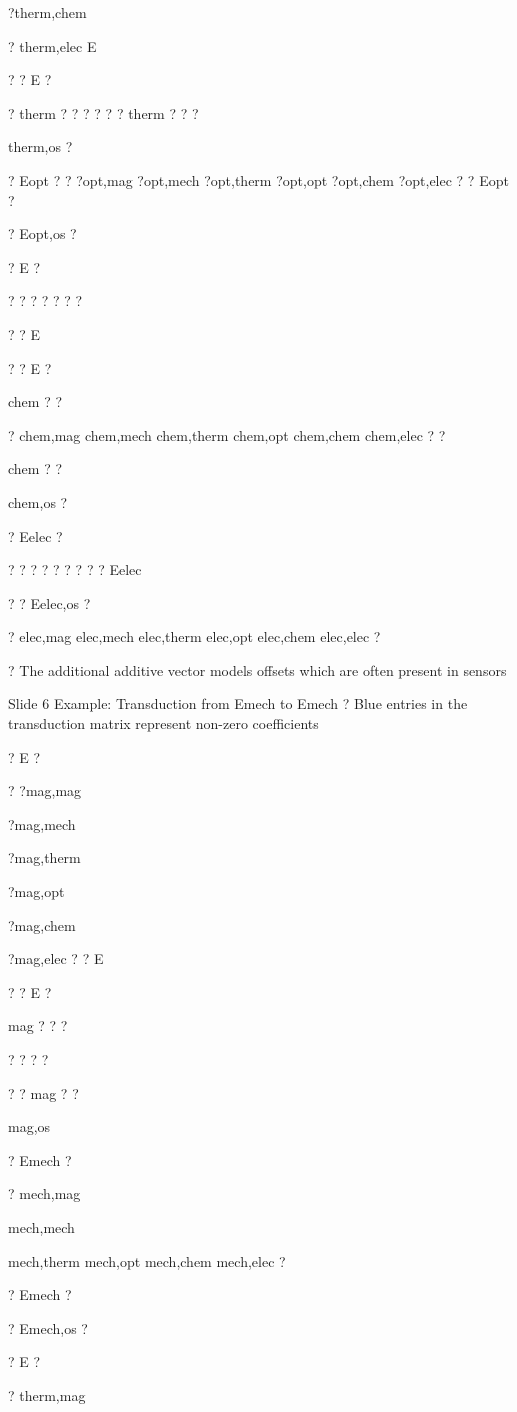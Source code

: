 \documentclass[2pt,landscape]{article}
\begin{document}
\begin{multicols*}{5}
?therm,chem


?
therm,elec	E


?	? E	?


?	therm ? ? ?	? ? ?	therm ? ? ?


therm,os ?


? Eopt   ?	? ?opt,mag	?opt,mech	?opt,therm	?opt,opt	?opt,chem	?opt,elec   ? ? Eopt   ?


? Eopt,os   ?


? E	?


?
?	?	?	?	?	?


? ? E


?	? E	?


chem
?	?


?	chem,mag	chem,mech	chem,therm	chem,opt	chem,chem	chem,elec ?
?


chem
?	?


chem,os
?


? Eelec ?


? ?	?	?	?	?	?	? ? Eelec


?	? Eelec,os 
?


?	elec,mag	elec,mech	elec,therm	elec,opt	elec,chem	elec,elec ?

?	The additional additive vector models offsets 
which are often present in sensors


Slide 6	Example: Transduction from Emech to Emech
?	Blue entries in the transduction matrix represent non-zero coefficients



? E	?


? ?mag,mag


?mag,mech


?mag,therm


?mag,opt


?mag,chem


?mag,elec ? 
? E


?	? E	?


mag	? ?	?


?	?	?	?


? ?	mag ?	?


mag,os


? Emech ?


?	mech,mag


mech,mech


mech,therm	mech,opt	mech,chem	mech,elec ?


? Emech ?


? Emech,os ?


? E	?


?
therm,mag



\end{multicols*}
\end{document}
